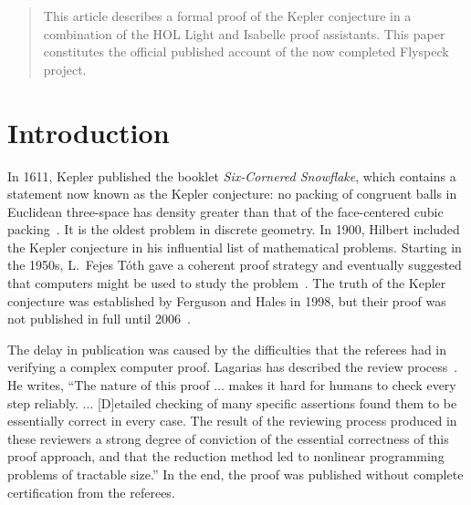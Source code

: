 \newcommand{\R}{\mathbb{R}}
\newcommand{\IR}{\mathbb{IR}}
\newcommand{\Arctan}{\mathop{\rm Arctan}}
\newcommand{\abss}[1]{\lvert#1\rvert}
\newcommand{\iabs}{\mathop{\rm iabs}}
\newcommand{\bx}{{\bf x}}
\newcommand{\GT}{G_{\hbox{\tiny Taylor}}}


\begin{abstract}
  This article describes a formal proof of the Kepler conjecture in a
  combination of the HOL Light and Isabelle proof assistants.  This
  paper constitutes the official published account of the now
  completed Flyspeck project.
\end{abstract}


\section{Introduction}


In 1611, Kepler published the booklet {\it Six-Cornered Snowflake},
which contains a statement now known as the Kepler conjecture: no
packing of congruent balls in Euclidean three-space has density
greater than that of the face-centered cubic packing~\cite{XX}.  It is
the oldest problem in discrete geometry.  In 1900, Hilbert included
the Kepler conjecture in his influential list of mathematical
problems.  Starting in the 1950s, L.\ Fejes T\'oth gave a coherent
proof strategy and eventually suggested that computers might be used
to study the problem~\cite{XX}.  The truth of the Kepler conjecture
was established by Ferguson and Hales in 1998, but their proof was not
published in full until 2006~\cite{DCG}.

The delay in publication was caused by the difficulties that the
referees had in verifying a complex computer proof.     Lagarias has
described the review process~\cite{LagXX}.
He writes, ``The nature of this proof $\ldots$ makes it hard for humans
to check every step reliably. $\ldots$ [D]etailed checking of many
specific assertions found them to be essentially correct in every
case.  The result of the reviewing process produced in these reviewers
a strong degree of conviction of the essential correctness of this
proof approach, and that the reduction method led to nonlinear
programming problems of tractable size.''  
In the end, the proof
was published without complete certification from the
referees.

